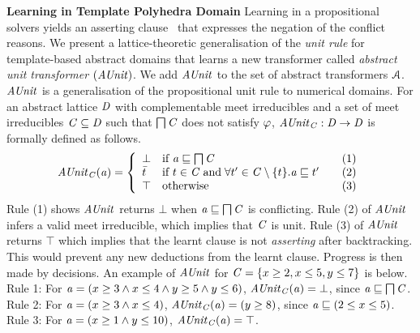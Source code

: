 \noindent \textbf{Learning in Template Polyhedra Domain}
%
Learning in a propositional solvers yields an asserting clause~\cite{cdcl}
that expresses the negation of the conflict reasons.  We present a
lattice-theoretic generalisation of the {\em unit rule} for template-based
abstract domains that learns a new transformer called {\em abstract unit
transformer} $(\mathit{AUnit})$.  We add $\mathit{AUnit}$ to the set of abstract
transformers $\mathcal{A}$.  $\mathit{AUnit}$ is a generalisation of the
propositional unit rule to numerical domains.  For an abstract lattice
$\mathit{D}$ with complementable meet irreducibles and a set of meet
irreducibles $\mathit{C} \subseteq \mathit{D}$ such that $\bigsqcap
\mathit{C}$ does not satisfy $\varphi$, $\mathit{AUnit}_{\mathit{C}}: \mathit{D}
\rightarrow \mathit{D}$ is formally defined as follows.
%
\[ \aunit_\conflictset(\absval) =
 \left\{\begin{array}{l@{\quad}l@{\qquad}l}
  \bot       & \text{if } \absval \sqsubseteq \bigsqcap \conflictset & (1)\\
  \bar{t}    & \text{if } t \in \conflictset \; \text{and} \; \forall t' \in \conflictset
  \setminus \{t\}. \absval  \sqsubseteq t' & (2) \\
  \top & \text{otherwise} & (3) \\
 \end{array}\right.
\]
%
Rule (1) shows $\mathit{AUnit}$ returns $\bot$ when $\mathit{a} \sqsubseteq \bigsqcap
\mathit{C}$ is conflicting.  Rule (2) of $\mathit{AUnit}$ infers a valid meet
irreducible, which implies that $\mathit{C}$ is unit.  Rule (3) of
$\mathit{AUnit}$ returns $\top$ which implies that the learnt clause is not {\em
asserting} after backtracking.  This would prevent any new deductions from
the learnt clause.  Progress is then made by decisions.  An example of
$\mathit{AUnit}$ for $\mathit{C} = \{x \geq 2, x \leq 5, y \leq 7 \}$ is below.  \\
%
Rule 1: 
For $\mathit{a} = (x \geq 3\wedge\allowbreak x \leq
4\wedge\allowbreak y \geq 5\wedge y \leq 6)$, 
$\mathit{AUnit}_{\mathit{C}}(\mathit{a}) = \bot$, since $\mathit{a}
\sqsubseteq \bigsqcap\mathit{C}$.  \\ 
Rule 2:  
For $\mathit{a} = (x \geq 3\wedge x \leq 4)$,  
$\mathit{AUnit}_{\mathit{C}}(\mathit{a}) = (y \geq 8)$, since
$\mathit{a} \sqsubseteq (2 \leq x \leq 5)$. \\ 
%
Rule 3: 
For $\mathit{a} = (x \geq 1\wedge y \leq 10)$, 
$\mathit{AUnit}_{\mathit{C}}(\mathit{a}) = \top$. \\


